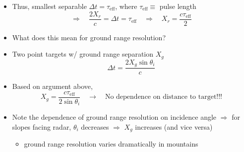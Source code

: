 \documentclass[11pt, oneside]{article}
\newcommand{\teff}{\tau_\mathrm{eff}}
\begin{document}
\begin{itemize}
	\item[--] Thus, smallest separable $\Delta t = \teff$, where $\teff \equiv$ pulse length
	\begin{equation}
		\label{e:xr}
		\Rightarrow\quad \frac{2X_r}{c} = \Delta t = \teff \quad\Rightarrow\quad X_r = \frac{c\teff}{2}
	\end{equation}
	\item[--] What does this mean for ground range resolution?
	\item[--] Two point targets w/ ground range separation $X_g$
	\begin{equation}
		\label{e:dtg}
		\Delta t = \frac{2X_g\sin\theta_i}{c}
	\end{equation}
	\item[--] Based on argument above,
	\begin{equation}
		\label{e:xg}
		X_g = \frac{c\teff}{2\sin\theta_i} \quad \longrightarrow \quad \boxed{\text{No dependence on distance to target!!!}}
	\end{equation}
	\item[--] Note the dependence of ground range resolution on incidence angle $\Rightarrow$ for slopes facing radar, $\theta_i$ decreases $\Rightarrow$ $X_g$ increases (and vice versa)
	\begin{itemize}
		\item[$\bigstar$] ground range resolution varies dramatically in mountains
	\end{itemize}
\end{itemize}
\end{document}
